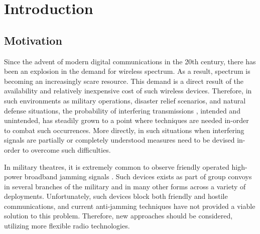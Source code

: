 \chapter{Introduction}
\label{ch:introduction}
\section{Motivation}

Since the advent of modern digital communications in the 20th century, there has been an explosion in the demand for wireless spectrum. As a result, spectrum is becoming an increasingly scare resource. This demand is a direct result of the availability and relatively inexpensive cost of such wireless devices. Therefore, in such environments as military operations, disaster relief scenarios, and natural defense situations, the probability of interfering transmissions \cite{scarcity}, intended and unintended, has steadily grown to a point where techniques are needed in-order to combat such occurrences. More directly, in such situations when interfering signals are partially or completely understood measures need to be devised in-order to overcome such difficulties.



In military theatres, it is extremely common to observe friendly operated high-power broadband jamming signals \cite{frater}.  Such devices exists as part of group convoys in several branches of the military and in many other forms across a variety of deployments.  Unfortunately, such devices block both friendly and hostile communications, and current anti-jamming techniques have not provided a viable solution to this problem.  Therefore, new approaches should be considered, utilizing more flexible radio technologies.\\

